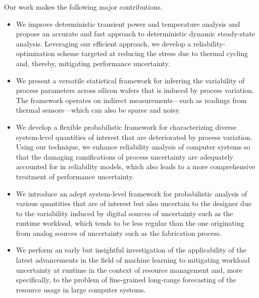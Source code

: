 Our work makes the following major contributions.

\begin{itemize}

\item
We improve deterministic transient power and temperature analysis and propose an
accurate and fast approach to deterministic dynamic steady-state analysis.
Leveraging our efficient approach, we develop a reliability-optimization scheme
targeted at reducing the stress due to thermal cycling and, thereby, mitigating
performance uncertainty.

\item
We present a versatile statistical framework for inferring the variability of
process parameters across silicon wafers that is induced by process variation.
The framework operates on indirect measurements---such as readings from thermal
sensors---which can also be sparse and noisy.

\item
We develop a flexible probabilistic framework for characterizing diverse
system-level quantities of interest that are deteriorated by process variation.
Using our technique, we enhance reliability analysis of computer systems so that
the damaging ramifications of process uncertainty are adequately accounted for
in reliability models, which also leads to a more comprehensive treatment of
performance uncertainty.

\item
We introduce an adept system-level framework for probabilistic analysis of
various quantities that are of interest but also uncertain to the designer due
to the variability induced by digital sources of uncertainty such as the runtime
workload, which tends to be less regular than the one originating from analog
sources of uncertainty such as the fabrication process.

\item
We perform an early but insightful investigation of the applicability of the
latest advancements in the field of machine learning to mitigating workload
uncertainty at runtime in the context of resource management and, more
specifically, to the problem of fine-grained long-range forecasting of the
resource usage in large computer systems.

\end{itemize}
